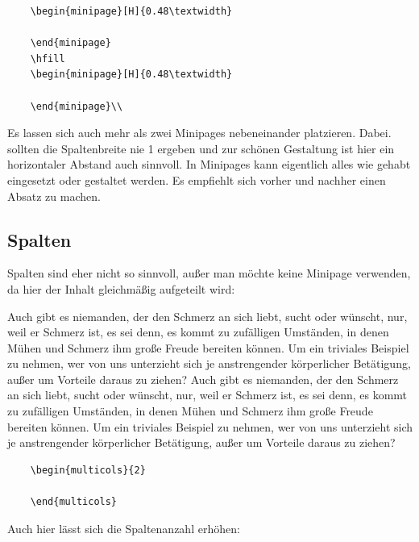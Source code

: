 \begin{verbatim}
    \begin{minipage}[H]{0.48\textwidth}
    	
    \end{minipage}
    \hfill
    \begin{minipage}[H]{0.48\textwidth}
    	
    \end{minipage}\\
\end{verbatim}

Es lassen sich auch mehr als zwei Minipages nebeneinander platzieren. Dabei. sollten die Spaltenbreite nie 1 ergeben und zur schönen Gestaltung ist hier ein horizontaler Abstand auch sinnvoll. In Minipages kann eigentlich alles wie gehabt eingesetzt oder gestaltet werden. Es empfiehlt sich vorher und nachher einen Absatz zu machen.


\subsection{Spalten}

Spalten sind eher nicht so sinnvoll, außer man möchte keine Minipage verwenden, da hier der Inhalt gleichmäßig aufgeteilt wird:

\begin{multicols}{2}
	Auch gibt es niemanden, der den Schmerz an sich liebt, sucht oder wünscht, nur, weil er Schmerz ist, es sei denn, es kommt zu zufälligen Umständen, in denen Mühen und Schmerz ihm große Freude bereiten können. Um ein triviales Beispiel zu nehmen, wer von uns unterzieht sich je anstrengender körperlicher Betätigung, außer um Vorteile daraus zu ziehen? Auch gibt es niemanden, der den Schmerz an sich liebt, sucht oder wünscht, nur, weil er Schmerz ist, es sei denn, es kommt zu zufälligen Umständen, in denen Mühen und Schmerz ihm große Freude bereiten können. Um ein triviales Beispiel zu nehmen, wer von uns unterzieht sich je anstrengender körperlicher Betätigung, außer um Vorteile daraus zu ziehen?
\end{multicols}

\begin{verbatim}
    \begin{multicols}{2}
    	
    \end{multicols}
\end{verbatim}

Auch hier lässt sich die Spaltenanzahl erhöhen:

